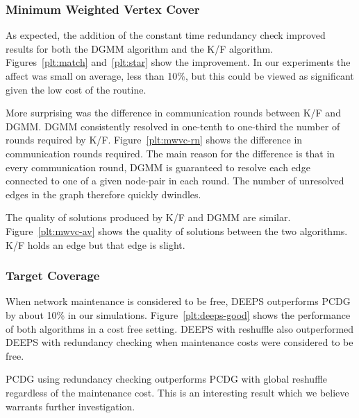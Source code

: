 \subsubsection{Minimum Weighted Vertex Cover}
\label{sub:mwvc-results}
As expected, the addition of the constant time redundancy check improved results for both the DGMM algorithm and the K/F algorithm. Figures~\ref{plt:match} and~\ref{plt:star} show the improvement. In our experiments the affect was small on average, less than 10\%, but this could be viewed as significant given the low cost of the routine. 


More surprising was the difference in communication rounds between K/F and DGMM. DGMM consistently resolved in one-tenth to one-third the number of rounds required by K/F. Figure~\ref{plt:mwvc-rn} shows the difference in communication rounds required. The main reason for the difference is that in every communication round, DGMM is guaranteed to resolve each edge connected to one of a given node-pair in each round. The number of unresolved edges in the graph therefore quickly dwindles.


The quality of solutions produced by K/F and DGMM are similar. Figure~\ref{plt:mwvc-av} shows the quality of solutions between the two algorithms. K/F holds an edge but that edge is slight.
  


\subsubsection{Target Coverage}

When network maintenance is considered to be free, DEEPS outperforms PCDG by about 10\% in our simulations. Figure~\ref{plt:deeps-good} shows the performance of both algorithms in a cost free setting. DEEPS with reshuffle also outperformed DEEPS with redundancy checking when maintenance costs were considered to be free.

PCDG using redundancy checking outperforms PCDG with global reshuffle regardless of the maintenance cost. This is an interesting result which we believe warrants further investigation.

